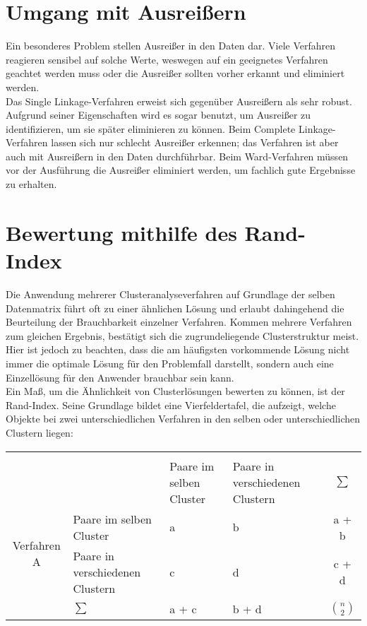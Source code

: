 \section{Umgang mit Ausreißern}

Ein besonderes Problem stellen Ausreißer in den Daten dar. Viele Verfahren reagieren sensibel auf solche Werte, weswegen auf ein geeignetes Verfahren geachtet werden muss oder die Ausreißer sollten vorher erkannt und eliminiert werden. \\
Das Single Linkage-Verfahren erweist sich gegenüber Ausreißern als sehr robust. Aufgrund seiner Eigenschaften wird es sogar benutzt, um Ausreißer zu identifizieren, um sie später eliminieren zu können. Beim Complete Linkage-Verfahren lassen sich nur schlecht Ausreißer erkennen; das Verfahren ist aber auch mit Ausreißern in den Daten durchführbar. Beim Ward-Verfahren müssen vor der Ausführung die Ausreißer eliminiert werden, um fachlich gute Ergebnisse zu erhalten.

\section{Bewertung mithilfe des Rand-Index}

Die Anwendung mehrerer Clusteranalyseverfahren auf Grundlage der selben Datenmatrix führt oft zu einer ähnlichen Lösung und erlaubt dahingehend die Beurteilung der Brauchbarkeit einzelner Verfahren. Kommen mehrere Verfahren zum gleichen Ergebnis, bestätigt sich die zugrundeliegende Clusterstruktur meist. Hier ist jedoch zu beachten, dass die am häufigsten vorkommende Lösung nicht immer die optimale Lösung für den Problemfall darstellt, sondern auch eine Einzellösung für den Anwender brauchbar sein kann. \\
Ein Maß, um die Ähnlichkeit von Clusterlösungen bewerten zu können, ist der Rand-Index. Seine Grundlage bildet eine Vierfeldertafel, die aufzeigt, welche Objekte bei zwei unterschiedlichen Verfahren in den selben oder unterschiedlichen Clustern liegen:

\begin{tabular}{c>{\raggedright\arraybackslash}p{4cm}|>{\centering\arraybackslash}p{3.5cm}>{\centering\arraybackslash}p{3.5cm}|c}
	& & \multicolumn{2}{c|}{Verfahren B} & \\ 
	& & Paare im selben Cluster & Paare in verschiedenen Clustern & $\sum$ \\ \hline
	\multirow{2}{*}{Verfahren A} & Paare im selben Cluster & a & b & a + b \\
	& Paare in verschiedenen Clustern & c & d & c + d \\ \hline
	& $\sum$ & a + c & b + d & $\binom{n}{2}$ \\ 
\end{tabular}
\bigskip

